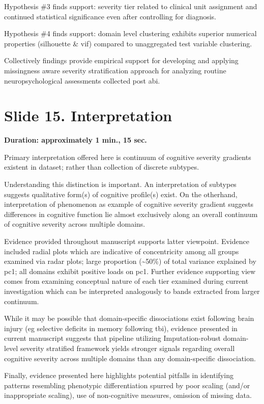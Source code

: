 \documentclass[
  11pt,
]{article}
\begin{document}
Hypothesis \#3 finds support: severity tier related to clinical unit
assignment and continued statistical significance even after controlling
for diagnosis.

Hypothesis \#4 finds support: domain level clustering exhibits superior
numerical properties (silhouette \& vif) compared to unaggregated test
variable clustering.

Collectively findings provide empirical support for developing and
applying missingness aware severity stratification approach for
analyzing routine neuropsychological assessments collected post abi.

\section{Slide 15. Interpretation}\label{slide-15.-interpretation}

\textbf{Duration: approximately 1 min., 15 sec.}

Primary interpretation offered here is continuum of cognitive severity
gradients existent in dataset; rather than collection of discrete
subtypes.

Understanding this distinction is important. An interpretation of
subtypes suggests qualitative form(s) of cognitive profile(s) exist. On
the otherhand, interpretation of phenomenon as example of cognitive
severity gradient suggests differences in cognitive function lie almost
exclusively along an overall continuum of cognitive severity across
multiple domains.

Evidence provided throughout manuscript supports latter viewpoint.
Evidence included radial plots which are indicative of concentricity
among all groups examined via radar plots; large proportion
(\textasciitilde50\%) of total variance explained by pc1; all domains
exhibit positive loads on pc1. Further evidence supporting view comes
from examining conceptual nature of each tier examined during current
investigation which can be interpreted analogously to bands extracted
from larger continuum.

While it may be possible that domain-specific dissociations exist
following brain injury (eg selective deficits in memory following tbi),
evidence presented in current manuscript suggests that pipeline
utilizing Imputation-robust domain-level severity stratified framework
yields stronger signals regarding overall cognitive severity across
multiple domains than any domain-specific dissociation.

Finally, evidence presented here highlights potential pitfalls in
identifying patterns resembling phenotypic differentiation spurred by
poor scaling (and/or inappropriate scaling), use of non-cognitive
measures, omission of missing data.
\end{document}
